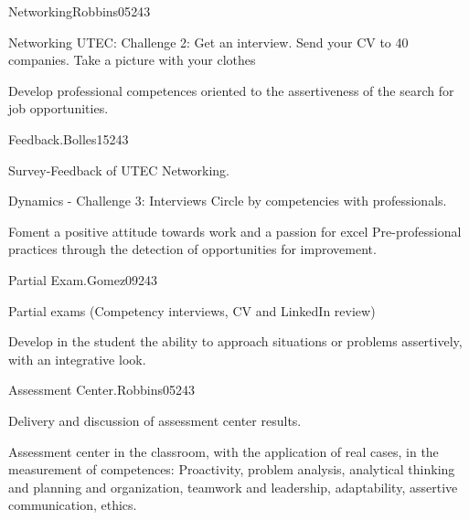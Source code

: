 \begin{syllabus}
\begin{unit}{Networking}{}{Robbins05}{24}{3}
   \begin{topics}
      \item Networking UTEC: Challenge 2: Get an interview. Send your CV to 40 companies. Take a picture with your clothes     
   \end{topics}

   \begin{learningoutcomes}
      \item Develop professional competences oriented to the assertiveness of the search for job opportunities.
   \end{learningoutcomes}
\end{unit}

\begin{unit}{Feedback.}{}{Bolles15}{24}{3}
   \begin{topics}
      \item Survey-Feedback of UTEC Networking.
      \item Dynamics - Challenge 3: Interviews Circle by competencies with professionals.
   \end{topics}

   \begin{learningoutcomes}
      \item Foment a positive attitude towards work and a passion for excel Pre-professional practices through the detection of opportunities for improvement.
   \end{learningoutcomes}
\end{unit}

\begin{unit}{Partial Exam.}{}{Gomez09}{24}{3}
   \begin{topics}
      \item Partial exams (Competency interviews, CV and LinkedIn review)
   \end{topics}

   \begin{learningoutcomes}
      \item Develop in the student the ability to approach situations or problems assertively, with an integrative look.
   \end{learningoutcomes}
\end{unit}

\begin{unit}{Assessment Center.}{}{Robbins05}{24}{3}
   \begin{topics}
      \item Delivery and discussion of assessment center results.
      \item Assessment center in the classroom, with the application of real cases, in the measurement of competences: Proactivity, problem analysis, analytical thinking and planning and organization, teamwork and leadership, adaptability, assertive communication, ethics.
    \end{topics}


\end{unit}
\end{syllabus}
